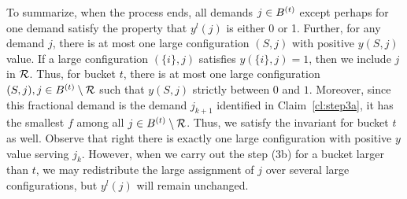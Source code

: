   To summarize, when the process ends, all demands $j \in B^{(t)}$  except perhaps for one demand satisfy the property that $y^l(j)$ is either 0 or 1. Further, for any demand $j$, there is at most one large configuration $(S,j)$ with positive $y(S,j)$ value. If a large configuration $(\{i\},j)$ satisfies $y(\{i\},j)=1$, then we include $j$ in ${\cal R}$. Thus, for bucket $t$, there is at most one large configuration $(S,j), j \in B^{(t)} \setminus {\cal R}$  such that $y(S,j)$ strictly between $0$ and $1$. Moreover, since this fractional demand is the demand $j_{k+1}$ identified in Claim~\ref{cl:step3a}, it has the smallest $f$ among all $j \in B^{(t)} \setminus {\cal R}$. Thus, we satisfy the invariant for bucket $t$ as well. Observe that right there is exactly one large configuration with positive $y$ value serving $j_k$. However, when we carry out the step (3b) for a bucket larger than $t$, we may redistribute the large assignment of $j$ over several large configurations, but $y^l(j)$ will remain unchanged.


